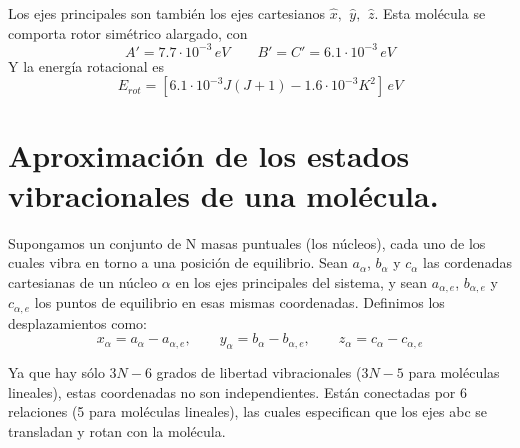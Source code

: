 \documentclass[a4paper]{article}
\begin{document}
Los ejes principales son también los ejes cartesianos $ \hat x, \,\ \hat y, \,\ \hat z$. 
Esta molécula se comporta rotor simétrico alargado, con 
 $$A'= 7.7 \cdot 10^{-3}\, eV \qquad B' = C' = 6.1 \cdot 10^{-3}\, eV $$
 Y la energía rotacional es
 $$E_{rot}=[6.1\cdot 10^{-3}J(J+1) -1.6 \cdot 10^{-3}K^2] \, eV$$
\section{Aproximación de los estados vibracionales de una molécula.}
Supongamos un conjunto de N masas puntuales (los núcleos), cada uno de los cuales vibra en torno a una posición de equilibrio. Sean $a_\alpha$, $b_\alpha$ y $c_\alpha$ las cordenadas cartesianas de un núcleo $\alpha$ en los ejes principales del sistema, y sean $a_{\alpha ,e}$, $b_{\alpha ,e}$ y $c_{\alpha ,e}$ los puntos de equilibrio en esas mismas coordenadas. Definimos los desplazamientos como:
\begin{equation}
x_\alpha = a_\alpha - a_{\alpha, e}, \qquad y_\alpha = b_\alpha - b_{\alpha, e}, \qquad z_\alpha = c_\alpha - c_{\alpha, e}
\end{equation}

Ya que hay sólo $3N-6$ grados de libertad vibracionales ($3N-5$ para moléculas lineales), estas coordenadas no son independientes. Están conectadas por 6 relaciones (5 para moléculas lineales), las cuales especifican que los ejes abc se transladan y rotan con la molécula.\\
\end{document}
